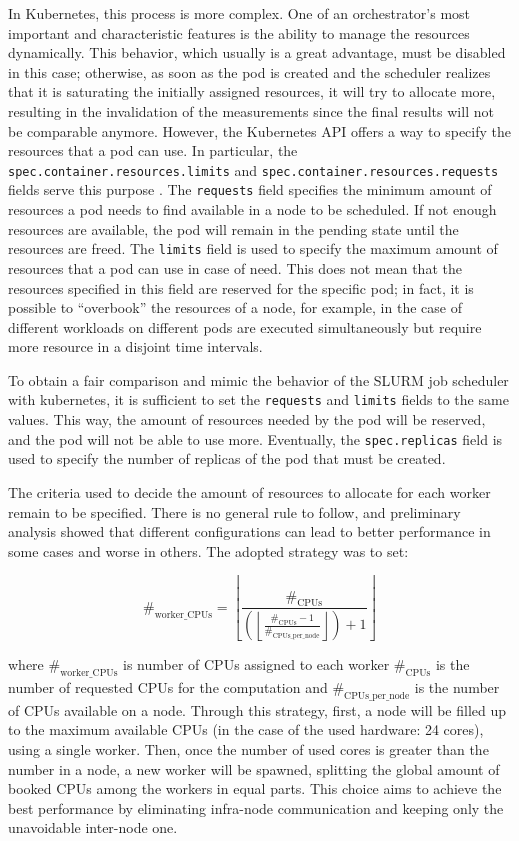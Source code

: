 In Kubernetes, this process is more complex.
One of an orchestrator's most important and characteristic features is the
ability to manage the resources dynamically.
This behavior, which usually is a great advantage, must be disabled in this
case; otherwise, as soon as the pod is created and the scheduler realizes that
it is saturating the initially assigned resources, it will try to allocate more,
resulting in the invalidation of the measurements since the final results will
not be comparable anymore.
However, the Kubernetes API offers a way to specify the resources that a pod can
use.
In particular, the \texttt{spec.container.resources.limits} and
\texttt{spec.container.resources.requests} fields serve this purpose
\cite{kdoc-resources}.
The \texttt{requests} field specifies the minimum amount of resources a pod
needs to find available in a node to be scheduled.
If not enough resources are available, the pod will remain in the pending state
until the resources are freed.
The \texttt{limits} field is used to specify the maximum amount of resources
that a pod can use in case of need.
This does not mean that the resources specified in this field are reserved for
the specific pod; in fact, it is possible to ``overbook'' the resources of a
node, for example, in the case of different workloads on different pods are
executed simultaneously but require more resource in a disjoint time intervals.

To obtain a fair comparison and mimic the behavior of the SLURM job scheduler
with kubernetes, it is sufficient to set the \texttt{requests} and
\texttt{limits} fields to the same values.
This way, the amount of resources needed by the pod will be reserved, and the
pod will not be able to use more.
Eventually, the \texttt{spec.replicas} field is used to specify the number of
replicas of the pod that must be created.

The criteria used to decide the amount of resources to allocate for each worker
remain to be specified.
There is no general rule to follow, and preliminary analysis showed that
different configurations can lead to better performance in some cases and worse
in others.
The adopted strategy was to set:

$$
\#_{\text{worker\_CPUs}} = \left\lfloor \frac{\#_{\text{CPUs}}}{\left( \left\lfloor
    \frac{\#_{\text{CPUs}} - 1}{\#_{\text{CPUs\_per\_node}}} \right\rfloor \right) + 1} \right\rfloor
$$

\noindent where $\#_{\text{worker\_CPUs}}$ is number of CPUs assigned to each
worker $\#_{\text{CPUs}}$ is the number of requested CPUs for the computation
and $\#_{\text{CPUs\_per\_node}}$ is the number of CPUs available on a node.
Through this strategy, first, a node will be filled up to the maximum available
CPUs (in the case of the used hardware: 24 cores), using a single worker.
Then, once the number of used cores is greater than the number in a node, a new
worker will be spawned, splitting the global amount of booked CPUs among the
workers in equal parts.
This choice aims to achieve the best performance by eliminating infra-node
communication and keeping only the unavoidable inter-node one.

